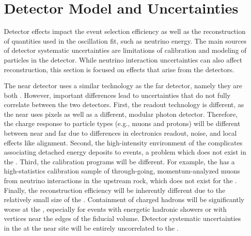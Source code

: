 \section{Detector Model and Uncertainties}
\label{sec:physics-lbnosc-syst}\label{sec:nu-osc-09}


Detector effects impact the event selection efficiency as well as the reconstruction of quantities used in the oscillation fit, such as neutrino energy. The main sources of detector systematic uncertainties are limitations of calibration and modeling of particles in the detector. While neutrino interaction uncertainties can also affect reconstruction, this section is focused on effects that arise from the detectors.

The near  detector uses a similar technology as the far detector, namely they are both . However, important differences lead to uncertainties that do not fully correlate between the two detectors. First, the readout technology is different, as the near  uses pixels as well as a different, modular photon detector. Therefore, the charge response to particle types (e.g., muons and protons) will be different between near and far due to differences in electronics readout, noise, and local effects like alignment.  Second, the high-intensity environment of the  complicates associating detached energy deposits to events, a problem which does not exist in the . Third, the calibration programs will be different. For example, the  has a high-statistics calibration sample of through-going, momentum-analyzed muons from neutrino interactions in the upstream rock, which does not exist for the . 
Finally, the reconstruction efficiency will be inherently different due to the relatively small size of the . Containment of charged hadrons will be significantly worse at the , especially for events with energetic hadronic showers or with vertices near the edges of the fiducial volume. Detector systematic uncertainties in the  at the near site will be entirely uncorrelated to the .

